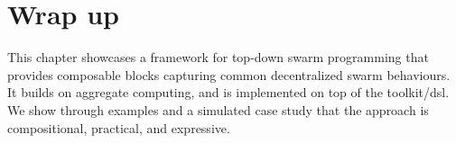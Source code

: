 %
%
%

\section{Wrap up}
\label{coordination2023-macro:sec:conc}

This chapter showcases
 a framework 
 for top-down swarm programming
 that provides composable blocks 
 capturing common decentralized swarm behaviours.
%
It builds on aggregate computing,
 and is implemented on top of the \scafi{} toolkit/\ac{dsl}.
%
We show through examples and a simulated case study
 that the approach is compositional, practical, and expressive.
%
